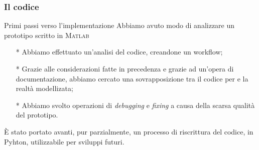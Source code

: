 \begin{frame}
\frametitle{Il codice}
\begin{block}{Primi passi verso l'implementazione}
Abbiamo avuto modo di analizzare un prototipo scritto in \textsc{Matlab}
\end{block}

\begin{block}{}
\begin{itemize}
\item[*] Abbiamo effettuato un'analisi del codice, creandone un workflow;
\item[*] Grazie alle considerazioni fatte in precedenza e grazie ad un'opera
di documentazione, abbiamo cercato una sovrapposizione tra il codice per 
e la realtà modellizata;
\item[*] Abbiamo svolto operazioni di \textit{debugging} e \textit{fixing}
a causa della scarsa qualità del prototipo.
\end{itemize}
\end{block}

\begin{block}{}
\`E stato portato avanti, pur parzialmente, un processo di riscrittura del
codice, in Pyhton, utilizzabile per sviluppi futuri.
\end{block}
\end{frame}
